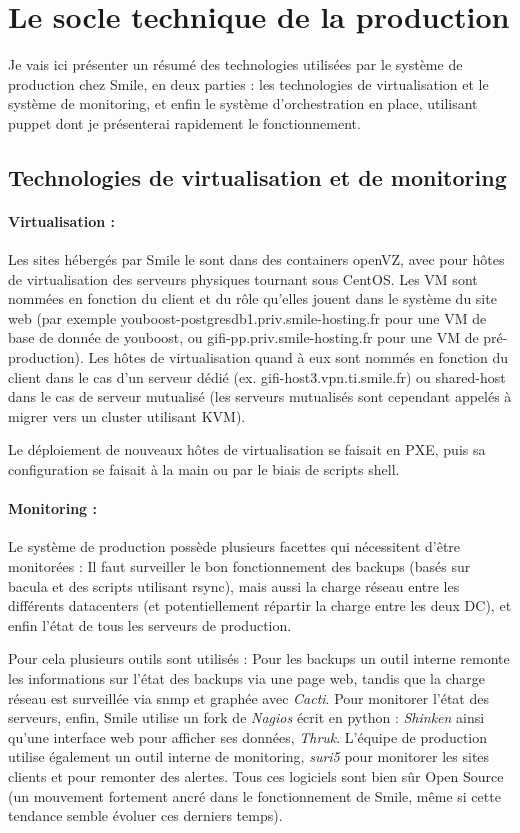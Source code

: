 \documentclass[14 pt]{extreport}
\begin{document}
\section{Le socle technique de la production}

Je vais ici présenter un résumé des technologies utilisées par le système de production chez Smile, en deux parties : les technologies de virtualisation et le système de monitoring, et enfin le système d'orchestration en place, utilisant puppet dont je présenterai rapidement le fonctionnement.
\subsection{Technologies de virtualisation et de monitoring}
\paragraph{Virtualisation :}Les sites hébergés par Smile le sont dans des containers openVZ, avec pour hôtes de virtualisation des serveurs physiques tournant sous CentOS. Les VM sont nommées en fonction du client et du rôle qu'elles jouent dans le système du site web (par exemple youboost-postgresdb1.priv.smile-hosting.fr pour une VM de base de donnée de youboost, ou gifi-pp.priv.smile-hosting.fr pour une VM de pré-production). Les hôtes de virtualisation quand à eux sont nommés en fonction du client dans le cas d'un serveur dédié (ex. gifi-host3.vpn.ti.smile.fr) ou shared-host dans le cas de serveur mutualisé (les serveurs mutualisés sont cependant appelés à migrer vers un cluster utilisant KVM).

Le déploiement de nouveaux hôtes de virtualisation se faisait en PXE, puis sa configuration se faisait à la main ou par le biais de scripts shell.


\paragraph{Monitoring :}Le système de production possède plusieurs facettes qui nécessitent d'être monitorées : Il faut surveiller le bon fonctionnement des backups (basés sur bacula et des scripts utilisant rsync), mais aussi la charge réseau entre les différents datacenters (et potentiellement répartir la charge entre les deux DC), et enfin l'état de tous les serveurs de production.

Pour cela plusieurs outils sont utilisés : Pour les backups un outil interne remonte les informations sur l'état des backups via une page web, tandis que la charge réseau est surveillée via snmp et graphée avec \emph{Cacti}. Pour monitorer l'état des serveurs, enfin, Smile utilise un fork de \emph{Nagios} écrit en python : \emph{Shinken} ainsi qu'une interface web pour afficher ses données, \emph{Thruk}. L'équipe de production utilise également un outil interne de monitoring, \emph{suri5} pour monitorer les sites clients et pour remonter des alertes. Tous ces logiciels sont bien sûr Open Source (un mouvement fortement ancré dans le fonctionnement de Smile, même si cette tendance semble évoluer ces derniers temps).
\end{document}
